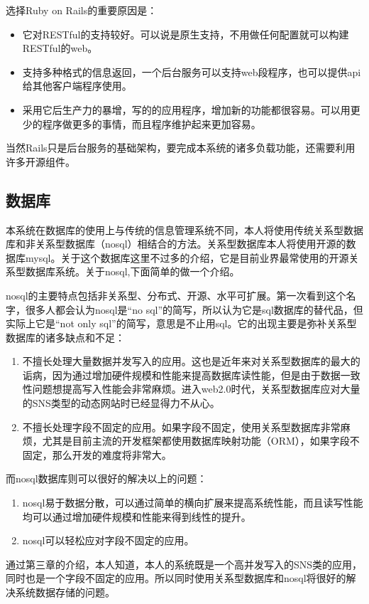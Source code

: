 选择Ruby on Rails的重要原因是：
\begin{itemize}
\item 它对RESTful的支持较好。可以说是原生支持，不用做任何配置就可以构建RESTful的web。
\item 支持多种格式的信息返回，一个后台服务可以支持web段程序，也可以提供api给其他客户端程序使用。
\item 采用它后生产力的暴增，写的的应用程序，增加新的功能都很容易。可以用更少的程序做更多的事情，而且程序维护起来更加容易。
\end{itemize}

当然Rails只是后台服务的基础架构，要完成本系统的诸多负载功能，还需要利用许多开源组件。

\subsection{数据库}
\label{sec:database}

本系统在数据库的使用上与传统的信息管理系统不同，本人将使用传统关系型数据库和非关系型数据库（nosql）相结合的方法。关系型数据库本人将使用开源的数据库mysql\cite{dubois2003mysql}。关于这个数据库这里不过多的介绍，它是目前业界最常使用的开源关系型数据库系统。关于nosql,下面简单的做一个介绍。

nosql的主要特点包括非关系型、分布式、开源、水平可扩展。第一次看到这个名字，很多人都会认为nosql\cite{tiwari2011professional,strauch2011nosql,membrey2010definitive}是“no sql”的简写，所以认为它是sql数据库的替代品，但实际上它是“not only sql”的简写，意思是不止用sql。它的出现主要是弥补关系型数据库的诸多缺点和不足：
\begin{enumerate}
\item 不擅长处理大量数据并发写入的应用。这也是近年来对关系型数据库的最大的诟病，因为通过增加硬件规模和性能来提高数据库读性能，但是由于数据一致性问题想提高写入性能会非常麻烦。进入web2.0时代，关系型数据库应对大量的SNS类型的动态网站时已经显得力不从心。
\item 不擅长处理字段不固定的应用。如果字段不固定，使用关系型数据库非常麻烦，尤其是目前主流的开发框架都使用数据库映射功能（ORM），如果字段不固定，那么开发的难度将非常大。
\end{enumerate}
而nosql数据库则可以很好的解决以上的问题：
\begin{enumerate}
\item nosql易于数据分散，可以通过简单的横向扩展来提高系统性能，而且读写性能均可以通过增加硬件规模和性能来得到线性的提升。
\item nosql可以轻松应对字段不固定的应用。
\end{enumerate}
通过第三章的介绍，本人知道，本人的系统既是一个高并发写入的SNS类的应用，同时也是一个字段不固定的应用。所以同时使用关系型数据库和nosql将很好的解决系统数据存储的问题。


